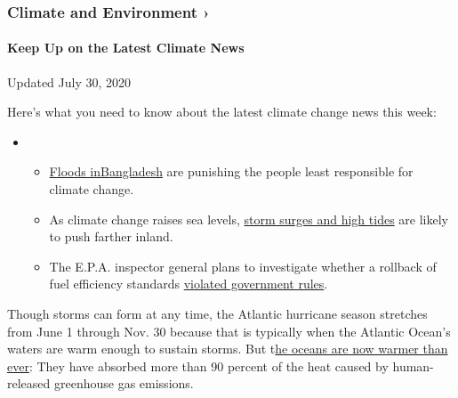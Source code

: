 \hypertarget{climate-and-environment-}{%
\subsubsection{Climate and Environment
›}\label{climate-and-environment-}}

\hypertarget{keep-up-on-the-latest-climate-news}{%
\paragraph{Keep Up on the Latest Climate
News}\label{keep-up-on-the-latest-climate-news}}

Updated July 30, 2020

Here's what you need to know about the latest climate change news this
week:

\begin{itemize}
\item
  \begin{itemize}
  \tightlist
  \item
    \href{https://www.nytimes3xbfgragh.onion/2020/07/30/climate/bangladesh-floods.html?action=click\&pgtype=Article\&state=default\&region=MAIN_CONTENT_1\&context=storylines_keepup}{Floods
    in}\href{https://www.nytimes3xbfgragh.onion/2020/07/30/climate/bangladesh-floods.html?action=click\&pgtype=Article\&state=default\&region=MAIN_CONTENT_1\&context=storylines_keepup}{Bangladesh}
    are punishing the people least responsible for climate change.
  \item
    As climate change raises sea levels,
    \href{https://www.nytimes3xbfgragh.onion/2020/07/30/climate/sea-level-inland-floods.html?action=click\&pgtype=Article\&state=default\&region=MAIN_CONTENT_1\&context=storylines_keepup}{storm
    surges and high tides} are likely to push farther inland.
  \item
    The E.P.A. inspector general plans to investigate whether a rollback
    of fuel efficiency standards
    \href{https://www.nytimes3xbfgragh.onion/2020/07/27/climate/trump-fuel-efficiency-rule.html?action=click\&pgtype=Article\&state=default\&region=MAIN_CONTENT_1\&context=storylines_keepup}{violated
    government rules}.
  \end{itemize}
\end{itemize}

Though storms can form at any time, the Atlantic hurricane season
stretches from June 1 through Nov. 30 because that is typically when the
Atlantic Ocean's waters are warm enough to sustain storms. But
t\href{https://www.nytimes3xbfgragh.onion/2019/01/10/climate/ocean-warming-climate-change.html}{he
oceans are now warmer than ever}: They have absorbed more than 90
percent of the heat caused by human-released greenhouse gas emissions.

